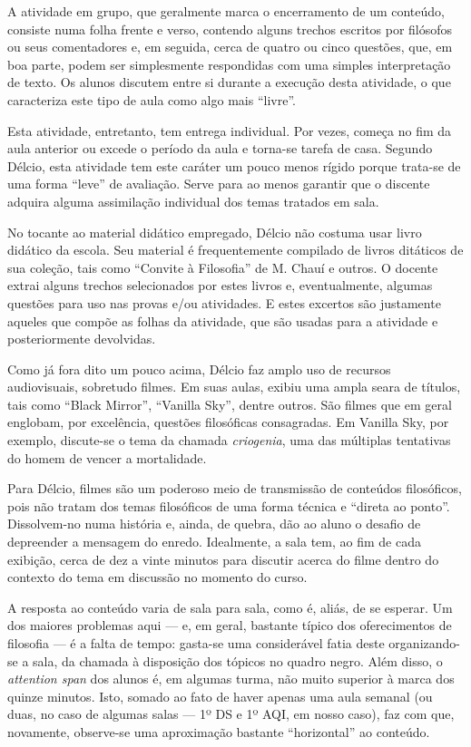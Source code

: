 \documentclass[12pt,a4paper]{article}
\begin{document}
    A atividade em grupo, que geralmente marca o encerramento de um conteúdo, 
    consiste numa folha frente e verso, contendo alguns trechos escritos por 
    filósofos ou seus comentadores e, em seguida, cerca de quatro ou cinco 
    questões, que, em boa parte, podem ser simplesmente respondidas com 
    uma simples interpretação de texto. Os alunos discutem entre si durante 
    a execução desta atividade, o que caracteriza este tipo de aula como algo 
    mais ``livre''. 
    
    Esta atividade, entretanto, tem entrega individual. Por vezes, começa no 
    fim da aula anterior ou excede o período da aula e torna-se tarefa de casa. 
    Segundo Délcio, esta atividade tem este caráter um pouco menos rígido 
    porque trata-se de uma forma ``leve'' de avaliação. Serve para ao menos 
    garantir que o discente adquira alguma assimilação individual dos temas 
    tratados em sala. 
    
    No tocante ao material didático empregado, Délcio não costuma usar livro 
    didático da escola. Seu material é frequentemente compilado de livros 
    ditáticos de sua coleção, tais como ``Convite à Filosofia'' de M. Chauí e 
    outros. O docente extrai alguns trechos 
    selecionados por estes livros e, eventualmente, algumas questões para uso 
    nas provas e/ou atividades. E estes excertos são justamente aqueles que 
    compõe as folhas da atividade, que são usadas para a atividade e 
    posteriormente devolvidas. 
    
    Como já fora dito um pouco acima, Délcio faz amplo uso de recursos 
    audiovisuais, sobretudo filmes. Em suas aulas, exibiu uma ampla seara 
    de títulos, tais como ``Black Mirror'', ``Vanilla Sky'', dentre outros. 
    São filmes que em geral englobam, por excelência, questões filosóficas 
    consagradas. Em Vanilla Sky, por exemplo, discute-se o tema da chamada 
    \textit{criogenia}, uma das múltiplas tentativas do homem de vencer a 
    mortalidade. 
    
    Para Délcio, filmes são um poderoso meio de transmissão de conteúdos 
    filosóficos, pois não tratam dos temas filosóficos de uma forma técnica e 
    ``direta ao ponto''. Dissolvem-no numa história e, ainda, de quebra, dão ao 
    aluno o desafio de depreender a mensagem do enredo. Idealmente, a sala tem, 
    ao fim de cada exibição, cerca de dez a vinte minutos para discutir acerca 
    do filme dentro do contexto do tema em discussão no momento do curso. 
    
    A resposta ao conteúdo varia de sala para sala, como é, aliás, de se 
    esperar. Um dos maiores problemas aqui --- e, em geral, bastante típico 
    dos oferecimentos de filosofia --- é a falta de tempo: gasta-se 
    uma considerável fatia deste organizando-se a sala, da chamada à disposição 
    dos tópicos no quadro negro. Além disso, o \textit{attention span} dos 
    alunos é, em algumas turma, não muito superior à marca dos quinze minutos. 
    Isto, somado ao fato de haver apenas uma aula semanal (ou duas, no caso de 
    algumas salas --- 1º DS e 1º AQI, em nosso caso), faz com que, novamente, 
    observe-se uma aproximação bastante ``horizontal'' ao conteúdo. 
    
\end{document}

